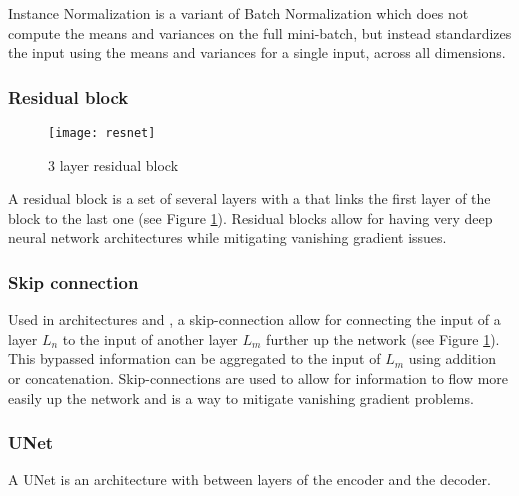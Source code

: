 Instance Normalization \citep{Ulyanov2016} is a variant of Batch Normalization which does not compute the means and variances on the full mini-batch, but instead standardizes the input using the means and variances for a single input, across all dimensions.

\subsubsection*{Residual block} \label{gl:resblock}

\begin{figure}
	\centering
	\texttt{[image: resnet]}
	\caption{3 layer residual block}
	\label{fig:resblock}
\end{figure}

A residual block is a set of several layers with a  that links the first layer of the block to the last one (see Figure \ref{fig:resblock}). Residual blocks allow for having very deep neural network architectures while mitigating vanishing gradient issues.

\subsubsection*{Skip connection} \label{gl:skip}

Used in  architectures and , a skip-connection allow for connecting the input of a layer $L_n$ to the input of another layer $L_m$ further up the network (see Figure \ref{fig:resblock}). This bypassed information can be aggregated to the input of $L_m$ using addition or concatenation. Skip-connections are used to allow for information to flow more easily up the network and is a way to mitigate vanishing gradient problems.

\subsubsection*{UNet} \label{gl:unet} A UNet  \citep{Ronneberger2015} is an  architecture with  between layers of the encoder and the decoder.